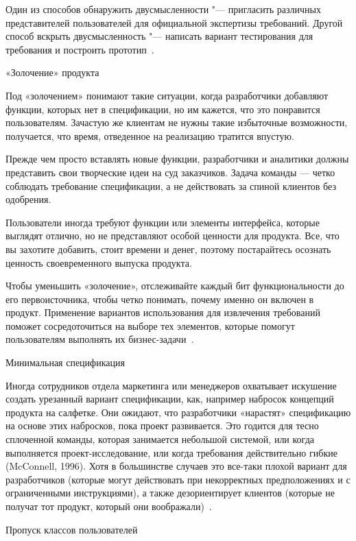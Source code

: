 \documentclass{../industrial-development}
\begin{document}
{Один из способов обнаружить двусмысленности "--- пригласить различных представителей пользователей для официальной экспертизы требований. Другой способ вскрыть двусмысленность "--- написать вариант тестирования для требования и построить прототип~\cite[с.~18]{Wiegers}.

\alert{«Золочение» продукта}

Под «золочением» понимают такие ситуации, когда разработчики добавляют функции, которых нет в спецификации, но им кажется, что это понравится пользователям. Зачастую же клиентам не нужны такие избыточные возможности, получается, что время, отведенное на реализацию тратится впустую.

Прежде чем просто вставлять новые функции, разработчики и аналитики должны представить свои творческие идеи на суд заказчиков. Задача команды — четко соблюдать требование спецификации, а не действовать за спиной клиентов без одобрения.

Пользователи иногда требуют функции или элементы интерфейса, которые выглядят отлично, но не представляют особой ценности для продукта. Все, что вы захотите добавить, стоит времени и денег, поэтому постарайтесь осознать ценность своевременного выпуска продукта. 

Чтобы уменьшить «золочение», отслеживайте каждый бит функциональности до его первоисточника, чтобы четко понимать, почему именно он включен в продукт. Применение вариантов использования для извлечения требований поможет сосредоточиться на выборе тех элементов, которые помогут пользователям выполнять их бизнес-задачи~\cite[с.~18-19]{Wiegers}.

\alert{Минимальная спецификация}

Иногда сотрудников отдела маркетинга или менеджеров охватывает искушение создать урезанный вариант спецификации, как, например набросок концепций продукта на салфетке. Они ожидают, что разработчики «нарастят» спецификацию на основе этих набросков, пока проект развивается. Это годится для тесно сплоченной команды, которая занимается небольшой системой, или когда выполняется проект-исследование, или когда требования действительно гибкие (McConnell, 1996). Хотя в большинстве случаев это все-таки плохой вариант для разработчиков (которые могут действовать при некорректных предположениях и с ограниченными инструкциями), а также дезориентирует клиентов (которые не получат тот продукт, который они воображали)~\cite[с.~19]{Wiegers}.

\alert{Пропуск классов пользователей}

}
\end{document}
